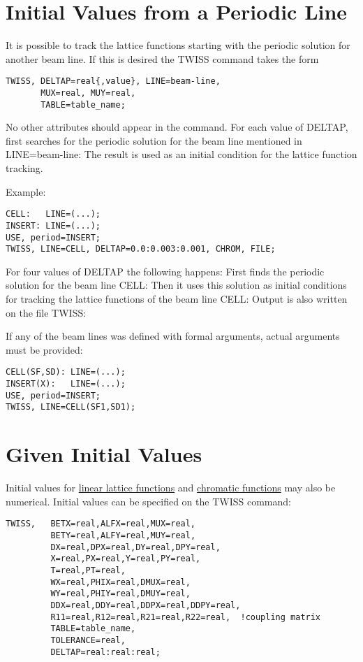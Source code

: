 \section{Initial Values from a Periodic Line}

It is possible to track the lattice functions starting with the periodic
solution for another beam line. If this is desired the TWISS command
takes the form  
\begin{verbatim}
TWISS, DELTAP=real{,value}, LINE=beam-line,
       MUX=real, MUY=real,
       TABLE=table_name;
\end{verbatim}
No other attributes should appear in the command. For each value of
DELTAP, \madx first searches for the periodic solution for the beam line
mentioned in LINE=beam-line: The result is used as an initial condition
for the lattice function tracking. 

Example: 
\begin{verbatim}
CELL:   LINE=(...);
INSERT: LINE=(...);
USE, period=INSERT;
TWISS, LINE=CELL, DELTAP=0.0:0.003:0.001, CHROM, FILE;
\end{verbatim}

For four values of DELTAP the following happens: First \madx finds the
periodic solution for the beam line CELL: Then it uses this solution as
initial conditions for tracking the lattice functions of the beam line
CELL: Output is also written on the file TWISS:  

If any of the beam lines was defined with formal arguments, actual
arguments must be provided:  
\begin{verbatim}
CELL(SF,SD): LINE=(...);
INSERT(X):   LINE=(...);
USE, period=INSERT;
TWISS, LINE=CELL(SF1,SD1);
\end{verbatim}

\section{Given Initial Values}

Initial values for \href{../Introduction/tables.html#linear}{linear
  lattice functions} and
\href{../Introduction/tables.html#chrom}{chromatic functions} may also
be numerical. Initial values can be specified on the TWISS command:  
\begin{verbatim}
TWISS,   BETX=real,ALFX=real,MUX=real,
         BETY=real,ALFY=real,MUY=real,
         DX=real,DPX=real,DY=real,DPY=real,
         X=real,PX=real,Y=real,PY=real,
         T=real,PT=real,
         WX=real,PHIX=real,DMUX=real,
         WY=real,PHIY=real,DMUY=real,
         DDX=real,DDY=real,DDPX=real,DDPY=real,
         R11=real,R12=real,R21=real,R22=real,  !coupling matrix
         TABLE=table_name,
         TOLERANCE=real,
         DELTAP=real:real:real;
\end{verbatim}

